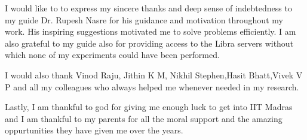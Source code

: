 \acknowledgements
I would like to to express my sincere thanks and deep sense of indebtedness to
my guide Dr. Rupesh Nasre for his guidance and motivation throughout my
work. His inspiring suggestions motivated me to solve problems efficiently. I am
also grateful to my guide also for providing access to the Libra servers without which none of my experiments could have been performed.\par
 \par
I would also thank Vinod Raju, Jithin K M, Nikhil Stephen,Hasit Bhatt,Vivek V P and all my colleagues who always helped me whenever needed in my research. \par
Lastly, I am thankful to god for giving me enough luck to get into IIT Madras and I am thankful to my parents for all the moral support and the amazing
oppurtunities they have given me over the years.


